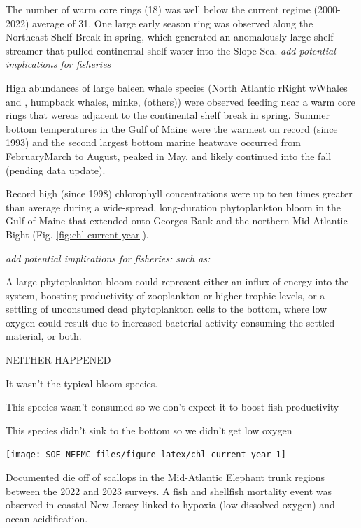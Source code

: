 \documentclass[
  10pt,
]{article}
\let\origfigure\figure
\let\endorigfigure\endfigure
\renewenvironment{figure}[1][2] {
    \expandafter\origfigure\expandafter[H]
} {
    \endorigfigure
}
\begin{document}
The number of warm core rings (18) was well below the current regime (2000-2022) average of 31. One large early season ring was observed along the Northeast Shelf Break in spring, which generated an anomalously large shelf streamer that pulled continental shelf water into the Slope Sea. \emph{add potential implications for fisheries}

High abundances of large baleen whale species (North Atlantic rRight wWhales and , humpback whales, minke, (others)) were observed feeding near a warm core rings that wereas adjacent to the continental shelf break in spring.
Summer bottom temperatures in the Gulf of Maine were the warmest on record (since 1993) and the second largest bottom marine heatwave occurred from FebruaryMarch to August, peaked in May, and likely continued into the fall (pending data update).

Record high (since 1998) chlorophyll concentrations were up to ten times greater than average during a wide-spread, long-duration phytoplankton bloom in the Gulf of Maine that extended onto Georges Bank and the northern Mid-Atlantic Bight (Fig. \ref{fig:chl-current-year}).

\emph{add potential implications for fisheries: such as:}

A large phytoplankton bloom could represent either an influx of energy into the system, boosting productivity of zooplankton or higher trophic levels, or a settling of unconsumed dead phytoplankton cells to the bottom, where low oxygen could result due to increased bacterial activity consuming the settled material, or both.

NEITHER HAPPENED

It wasn't the typical bloom species.

This species wasn't consumed so we don't expect it to boost fish productivity

This species didn't sink to the bottom so we didn't get low oxygen

\begin{figure}

{\centering \texttt{[image: SOE-NEFMC\_files/figure-latex/chl-current-year-1]} 

}

\end{figure}

Documented die off of scallops in the Mid-Atlantic Elephant trunk regions between the 2022 and 2023 surveys.
A fish and shellfish mortality event was observed in coastal New Jersey linked to hypoxia (low dissolved oxygen) and ocean acidification.
\end{document}

